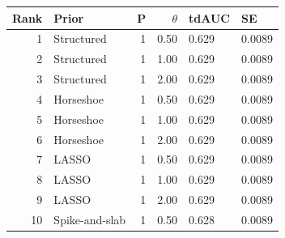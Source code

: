 \begin{tabular}{rlrrll}
  \hline
Rank & Prior & P & $\theta$ & tdAUC & SE \\ 
  \hline
  1 & Structured &   1 & 0.50 & 0.629 & 0.0089 \\ 
    2 & Structured &   1 & 1.00 & 0.629 & 0.0089 \\ 
    3 & Structured &   1 & 2.00 & 0.629 & 0.0089 \\ 
    4 & Horseshoe &   1 & 0.50 & 0.629 & 0.0089 \\ 
    5 & Horseshoe &   1 & 1.00 & 0.629 & 0.0089 \\ 
    6 & Horseshoe &   1 & 2.00 & 0.629 & 0.0089 \\ 
    7 & LASSO &   1 & 0.50 & 0.629 & 0.0089 \\ 
    8 & LASSO &   1 & 1.00 & 0.629 & 0.0089 \\ 
    9 & LASSO &   1 & 2.00 & 0.629 & 0.0089 \\ 
   10 & Spike-and-slab &   1 & 0.50 & 0.628 & 0.0089 \\ 
   \hline
\end{tabular}
